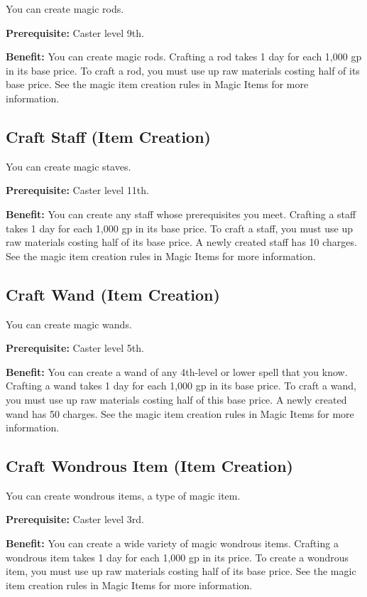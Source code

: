 				
You can create magic rods.
				
\textbf{Prerequisite:} Caster level 9th.
				
\textbf{Benefit:} You can create magic rods. Crafting a rod takes 1 day for each 1,000 gp in its base price. To craft a rod, you must use up raw materials costing half of its base price. See the magic item creation rules in Magic Items for more information.
				
\subsection{Craft Staff (Item Creation)}

				
You can create magic staves.
				
\textbf{Prerequisite:} Caster level 11th.
				
\textbf{Benefit:} You can create any staff whose prerequisites you meet. Crafting a staff takes 1 day for each 1,000 gp in its base price. To craft a staff, you must use up raw materials costing half of its base price. A newly created staff has 10 charges. See the magic item creation rules in Magic Items for more information.
				
\subsection{Craft Wand (Item Creation)}

				
You can create magic wands.
				
\textbf{Prerequisite:} Caster level 5th.
				
\textbf{Benefit:} You can create a wand of any 4th-level or lower spell that you know. Crafting a wand takes 1 day for each 1,000 gp in its base price. To craft a wand, you must use up raw materials costing half of this base price. A newly created wand has 50 charges. See the magic item creation rules in Magic Items for more information.
				
\subsection{Craft Wondrous Item (Item Creation)}

				
You can create wondrous items, a type of magic item.
				
\textbf{Prerequisite:} Caster level 3rd.
				
\textbf{Benefit:} You can create a wide variety of magic wondrous items. Crafting a wondrous item takes 1 day for each 1,000 gp in its price. To create a wondrous item, you must use up raw materials costing half of its base price. See the magic item creation rules in Magic Items for more information.

